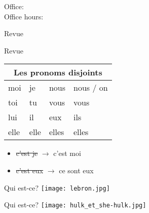 \documentclass{beamer}
\subtitle[Présentons-nous]{Présentons-nous}
\begin{document}
  \begin{frame}
    \titlepage
    \tiny{Office: \\
          Office hours: }
  \end{frame}

  \begin{frame}{Revue}
    \begin{center}
      
    \end{center}
  \end{frame}

  \begin{frame}{Revue}
    \begin{center}
      \begin{tabular}{l l l l}
        \multicolumn{4}{c}{Les pronoms disjoints} \\
        \hline
        \alert{moi}  & je   & \alert{nous}  & nous / on \\
        \alert{toi}  & tu   & \alert{vous}  & vous \\
        \alert{lui}  & il   & \alert{eux}   & ils \\
        \alert{elle} & elle & \alert{elles} & elles \\
      \end{tabular}
    \end{center}
    \begin{itemize}
      \item \sout{c'est je} $\to$ c'est \alert{moi}
      \item \sout{c'est eux} $\to$ \alert{ce sont} eux
    \end{itemize}
  \end{frame}

  \begin{frame}{Qui est-ce? }
    \centering
    \texttt{[image: lebron.jpg]}


  \end{frame}

  \begin{frame}{Qui est-ce? }
    \centering
    \texttt{[image: hulk\_et\_she-hulk.jpg]}


  \end{frame}
\end{document}
